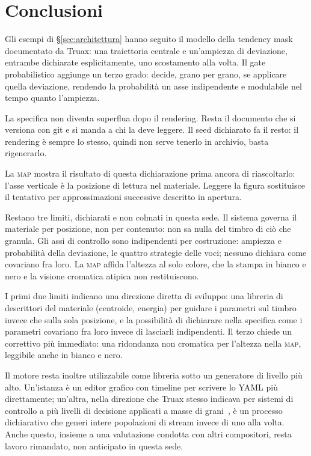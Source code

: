 \section{Conclusioni}\label{sec:conclusioni}

Gli esempi di \S\ref{sec:architettura} hanno seguito il modello della tendency
mask documentato da Truax: una traiettoria centrale e un'ampiezza di
deviazione, entrambe dichiarate esplicitamente, uno scostamento alla volta. Il
gate probabilistico aggiunge un terzo grado: decide, grano per grano, se
applicare quella deviazione, rendendo la probabilità un asse indipendente e
modulabile nel tempo quanto l'ampiezza.

La specifica non diventa superflua dopo il rendering. Resta il documento che
si versiona con git e si manda a chi la deve leggere. Il seed dichiarato fa il
resto: il rendering è sempre lo stesso, quindi non serve tenerlo in archivio,
basta rigenerarlo.

La \textsc{map} mostra il risultato di questa dichiarazione prima ancora di
riascoltarlo: l'asse verticale è la posizione di lettura nel materiale.
Leggere la figura sostituisce il tentativo per approssimazioni successive
descritto in apertura.

Restano tre limiti, dichiarati e non colmati in questa sede. Il sistema
governa il materiale per posizione, non per contenuto: non sa nulla del
timbro di ciò che granula. Gli assi di controllo sono indipendenti per
costruzione: ampiezza e probabilità della deviazione, le quattro strategie
delle voci; nessuno dichiara come covariano fra loro. La \textsc{map} affida
l'altezza al solo colore, che la stampa in bianco e nero e la visione
cromatica atipica non restituiscono.

I primi due limiti indicano una direzione diretta di sviluppo: una libreria
di descrittori del materiale (centroide, energia) per guidare i parametri sul
timbro invece che sulla sola posizione, e la possibilità di dichiarare nella
specifica come i parametri covariano fra loro invece di lasciarli
indipendenti. Il terzo chiede un correttivo più immediato: una ridondanza non
cromatica per l'altezza nella \textsc{map}, leggibile anche in bianco e nero.

Il motore resta inoltre utilizzabile come libreria sotto un generatore di
livello più alto. Un'istanza è un editor grafico con timeline per scrivere lo
YAML più direttamente; un'altra, nella direzione che Truax stesso indicava
per sistemi di controllo a più livelli di decisione applicati a masse di
grani~\cite[p.~25]{Truax1988}, è un processo dichiarativo che generi intere
popolazioni di stream invece di uno alla volta. Anche questo, insieme a una
valutazione condotta con altri compositori, resta lavoro rimandato, non
anticipato in questa sede.
